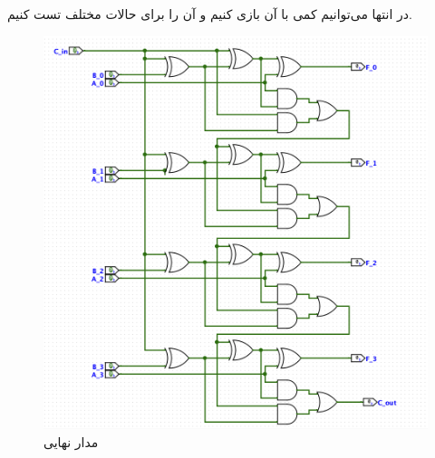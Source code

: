 در انتها می‌توانیم کمی با آن بازی کنیم و آن را برای حالات مختلف تست کنیم.

\begin{figure}[h]
\centering
\includegraphics[scale=0.3]{Experimental Methods/3.png}
\caption{
مدار نهایی
}
\end{figure}